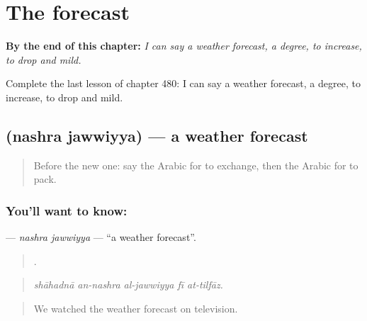 
\chapter{The forecast}
\label{ch:ar-the-forecast}

\begin{chapteropening}
\textbf{By the end of this chapter:} \emph{I can say a weather forecast, a degree, to increase, to drop and mild.}

Complete the last lesson of chapter 480: I can say a weather forecast, a degree, to increase, to drop and mild.
\end{chapteropening}

\section[\texorpdfstring{\ar{نشرة} \ar{جوية} (nashra jawwiyya)}{نشرة جوية (nashra jawwiyya)}]{  (nashra jawwiyya) — a weather forecast}

\label{lesson:AR-C480-nashra-jawwiyya}



\begin{quote}
Before the new one: say the Arabic for to exchange, then the Arabic for to pack.
\end{quote}

\subsection*{You'll want to know:  }
\textbf{ } — \emph{nashra jawwiyya} — \textquotedblleft{}a weather forecast\textquotedblright{}.

\begin{quote}
    .
\end{quote}

\begin{quote}
\emph{shāhadnā an-nashra al-jawwiyya fī at-tilfāz.}
\end{quote}

\begin{quote}
We watched the weather forecast on television.
\end{quote}

